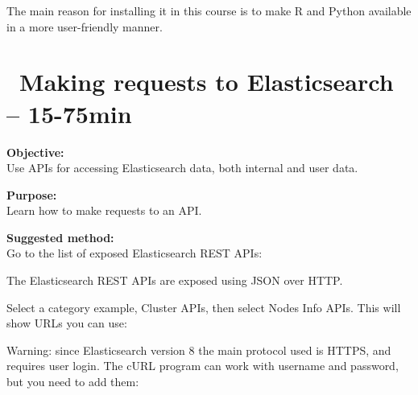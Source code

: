 \documentclass[a4paper,11pt,notitlepage]{report}
\begin{document}
The main reason for installing it in this course is to make R and Python available in a more user-friendly manner.



\chapter{\faInfoCircle\ Making requests to Elasticsearch -- 15-75min}
\label{ex:es-rest-api}


{\bf Objective:}\\
Use APIs for accessing Elasticsearch data, both internal and user data.

{\bf Purpose:}\\
Learn how to make requests to an API.

{\bf Suggested method:}\\
Go to the list of exposed Elasticsearch REST APIs:\\

The Elasticsearch REST APIs are exposed using JSON over HTTP.

Select a category example, Cluster APIs, then select Nodes Info APIs. This will show URLs you can use:

Warning: since Elasticsearch version 8 the main protocol used is HTTPS, and requires user login. The cURL program can work with username and password, but you need to add them:
\end{document}
